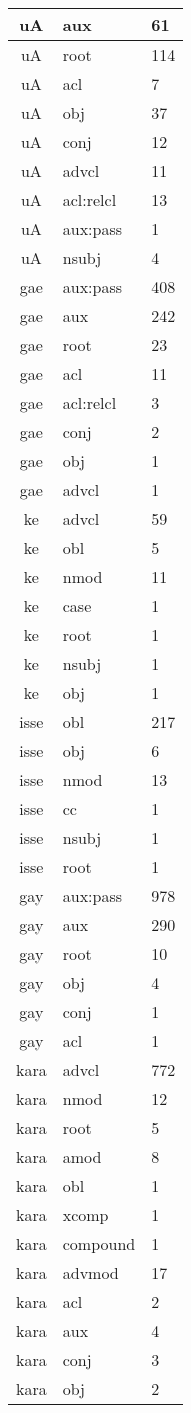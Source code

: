 \documentclass[a4 paper]{article}
\begin{document}
\begin{longtable}{cp{}p{}}
uA & aux & 61\\ \midrule uA & root & 114\\ \midrule uA & acl & 7\\ \midrule uA & obj & 37\\ \midrule uA & conj & 12\\ \midrule uA & advcl & 11\\ \midrule uA & acl:relcl & 13\\ \midrule uA & aux:pass & 1\\ \midrule uA & nsubj & 4\\ \midrule 
gae & aux:pass & 408\\ \midrule gae & aux & 242\\ \midrule gae & root & 23\\ \midrule gae & acl & 11\\ \midrule gae & acl:relcl & 3\\ \midrule gae & conj & 2\\ \midrule gae & obj & 1\\ \midrule gae & advcl & 1\\ \midrule 
ke & advcl & 59\\ \midrule ke & obl & 5\\ \midrule ke & nmod & 11\\ \midrule ke & case & 1\\ \midrule ke & root & 1\\ \midrule ke & nsubj & 1\\ \midrule ke & obj & 1\\ \midrule 
isse & obl & 217\\ \midrule isse & obj & 6\\ \midrule isse & nmod & 13\\ \midrule isse & cc & 1\\ \midrule isse & nsubj & 1\\ \midrule isse & root & 1\\ \midrule 
gay & aux:pass & 978\\ \midrule gay & aux & 290\\ \midrule gay & root & 10\\ \midrule gay & obj & 4\\ \midrule gay & conj & 1\\ \midrule gay & acl & 1\\ \midrule 
kara & advcl & 772\\ \midrule kara & nmod & 12\\ \midrule kara & root & 5\\ \midrule kara & amod & 8\\ \midrule kara & obl & 1\\ \midrule kara & xcomp & 1\\ \midrule kara & compound & 1\\ \midrule kara & advmod & 17\\ \midrule kara & acl & 2\\ \midrule kara & aux & 4\\ \midrule kara & conj & 3\\ \midrule kara & obj & 2\\ \midrule 

\end{longtable}
\end{document}
